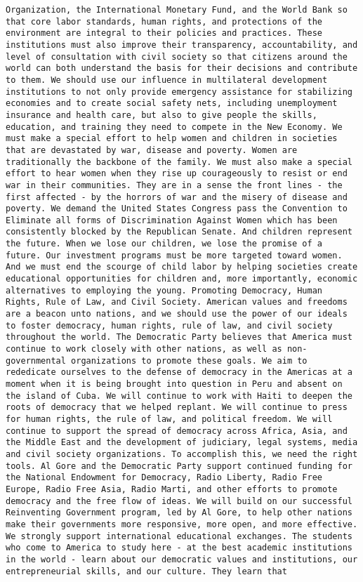 \documentclass[
]{article}
\begin{document}
\begin{verbatim}
Organization, the International Monetary Fund, and the World Bank so that core labor standards, human rights, and protections of the environment are integral to their policies and practices. These institutions must also improve their transparency, accountability, and level of consultation with civil society so that citizens around the world can both understand the basis for their decisions and contribute to them. We should use our influence in multilateral development institutions to not only provide emergency assistance for stabilizing economies and to create social safety nets, including unemployment insurance and health care, but also to give people the skills, education, and training they need to compete in the New Economy. We must make a special effort to help women and children in societies that are devastated by war, disease and poverty. Women are traditionally the backbone of the family. We must also make a special effort to hear women when they rise up courageously to resist or end war in their communities. They are in a sense the front lines - the first affected - by the horrors of war and the misery of disease and poverty. We demand the United States Congress pass the Convention to Eliminate all forms of Discrimination Against Women which has been consistently blocked by the Republican Senate. And children represent the future. When we lose our children, we lose the promise of a future. Our investment programs must be more targeted toward women. And we must end the scourge of child labor by helping societies create educational opportunities for children and, more importantly, economic alternatives to employing the young. Promoting Democracy, Human Rights, Rule of Law, and Civil Society. American values and freedoms are a beacon unto nations, and we should use the power of our ideals to foster democracy, human rights, rule of law, and civil society throughout the world. The Democratic Party believes that America must continue to work closely with other nations, as well as non-governmental organizations to promote these goals. We aim to rededicate ourselves to the defense of democracy in the Americas at a moment when it is being brought into question in Peru and absent on the island of Cuba. We will continue to work with Haiti to deepen the roots of democracy that we helped replant. We will continue to press for human rights, the rule of law, and political freedom. We will continue to support the spread of democracy across Africa, Asia, and the Middle East and the development of judiciary, legal systems, media and civil society organizations. To accomplish this, we need the right tools. Al Gore and the Democratic Party support continued funding for the National Endowment for Democracy, Radio Liberty, Radio Free Europe, Radio Free Asia, Radio Marti, and other efforts to promote democracy and the free flow of ideas. We will build on our successful Reinventing Government program, led by Al Gore, to help other nations make their governments more responsive, more open, and more effective. We strongly support international educational exchanges. The students who come to America to study here - at the best academic institutions in the world - learn about our democratic values and institutions, our entrepreneurial skills, and our culture. They learn that 
\end{verbatim}
\end{document}
